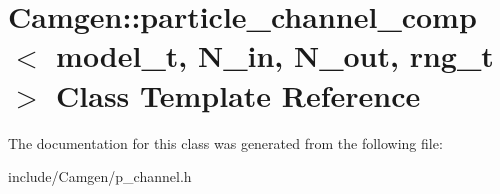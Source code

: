 \hypertarget{a00396}{\section{Camgen\-:\-:particle\-\_\-channel\-\_\-comp$<$ model\-\_\-t, N\-\_\-in, N\-\_\-out, rng\-\_\-t $>$ Class Template Reference}
\label{a00396}
}


The documentation for this class was generated from the following file\-:\begin{DoxyCompactItemize}
\item 
include/\-Camgen/p\-\_\-channel.\-h\end{DoxyCompactItemize}
